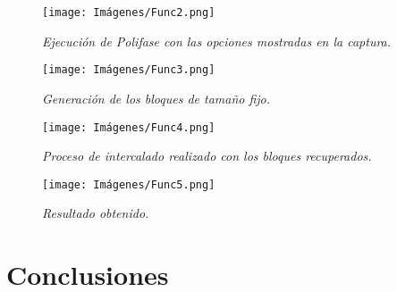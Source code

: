 \documentclass[letterpaper,12pt]{extarticle}
\begin{document}
\begin{figure}[h!]
    \centering
    \texttt{[image: Imágenes/Func2.png]}
    \caption{\textit{Ejecución de Polifase con las opciones mostradas en la captura.}}
    \label{fig:Func2}
    \end{figure} 
    
\pagebreak

\begin{figure}[h!]
    \centering
    \texttt{[image: Imágenes/Func3.png]}
    \caption{\textit{Generación de los bloques de tamaño fijo.}}
    \label{fig:Func3}
    \end{figure} 

\begin{figure}[h!]
    \centering
    \texttt{[image: Imágenes/Func4.png]}
    \caption{\textit{Proceso de intercalado realizado con los bloques recuperados.}}
    \label{fig:Func4}
    \end{figure} 
    
    \begin{figure}[h!]
    \centering
    \texttt{[image: Imágenes/Func5.png]}
    \caption{\textit{Resultado obtenido.}}
    \label{fig:Func5}
    \end{figure}
    




\newpage\section{Conclusiones}
\end{document}
